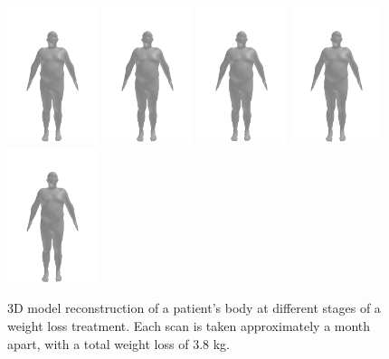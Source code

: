 \begin{figure}
	\centering
	\includegraphics[width=75pt]{files/patients/8_2}
	\includegraphics[width=75pt]{files/patients/8_3}
	\includegraphics[width=75pt]{files/patients/8_4}
	\includegraphics[width=75pt]{files/patients/8_5}
	\includegraphics[width=75pt]{files/patients/8_6}
	\caption[Reconstructed 3D body of a patient's scans]{3D model reconstruction of a patient's body at different stages of a weight loss
		treatment. Each scan is taken approximately a month apart, with a total
		weight loss of 3.8 kg.}
\end{figure}

